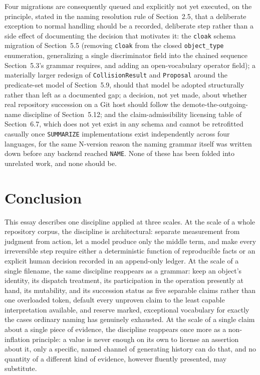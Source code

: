 \documentclass[11pt]{article}
\begin{document}
Four migrations are consequently queued and explicitly not yet executed, on the principle, stated in the naming resolution rule of Section~2.5, that a deliberate exception to normal handling should be a recorded, deliberate step rather than a side effect of documenting the decision that motivates it: the \texttt{cloak} schema migration of Section~5.5 (removing \texttt{cloak} from the closed \texttt{object\_type} enumeration, generalizing a single discriminator field into the chained sequence Section~5.3's grammar requires, and adding an open-vocabulary operator field); a materially larger redesign of \texttt{CollisionResult} and \texttt{Proposal} around the predicate-set model of Section~5.9, should that model be adopted structurally rather than left as a documented gap; a decision, not yet made, about whether real repository succession on a Git host should follow the demote-the-outgoing-name discipline of Section~5.12; and the claim-admissibility licensing table of Section~6.7, which does not yet exist in any schema and cannot be retrofitted casually once \texttt{SUMMARIZE} implementations exist independently across four languages, for the same N-version reason the naming grammar itself was written down before any backend reached \texttt{NAME}. None of these has been folded into unrelated work, and none should be.

\section{Conclusion}

This essay describes one discipline applied at three scales. At the scale of a whole repository corpus, the discipline is architectural: separate measurement from judgment from action, let a model produce only the middle term, and make every irreversible step require either a deterministic function of reproducible facts or an explicit human decision recorded in an append-only ledger. At the scale of a single filename, the same discipline reappears as a grammar: keep an object's identity, its dispatch treatment, its participation in the operation presently at hand, its mutability, and its succession status as five separable claims rather than one overloaded token, default every unproven claim to the least capable interpretation available, and reserve marked, exceptional vocabulary for exactly the cases ordinary naming has genuinely exhausted. At the scale of a single claim about a single piece of evidence, the discipline reappears once more as a non-inflation principle: a value is never enough on its own to license an assertion about it, only a specific, named channel of generating history can do that, and no quantity of a different kind of evidence, however fluently presented, may substitute.
\end{document}
